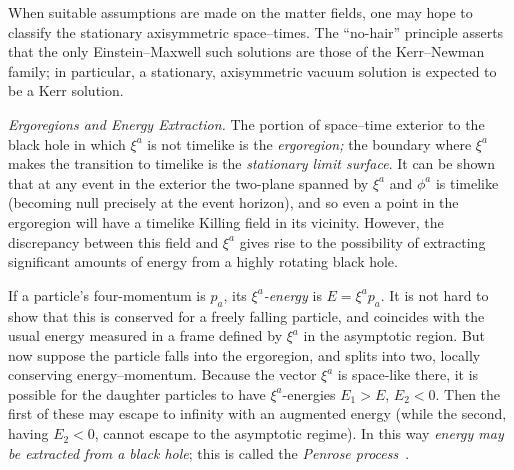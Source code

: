 \documentclass[12pt]{article}
\begin{document}
When suitable assumptions are made on the matter fields, one may hope to classify the stationary axisymmetric space--times.  The ``no-hair'' principle asserts that the only Einstein--Maxwell such solutions are those of the Kerr--Newman family; in particular, a stationary, axisymmetric vacuum solution is expected to be a Kerr solution.


{\em Ergoregions and Energy Extraction.}
The portion of space--time exterior to the black hole in which $\xi ^a$ is not timelike is the {\em ergoregion;} the boundary where $\xi ^a$ makes the transition to timelike is the {\em stationary limit surface}.
It can be shown that at any event in the exterior the two-plane spanned by $\xi ^a$ and $\phi ^a$ is timelike (becoming null precisely at the event horizon), and so even a point in the ergoregion will have a timelike Killing field in its vicinity.
However, the discrepancy between this field and $\xi ^a$
gives rise to the possibility of extracting significant amounts of energy from a highly rotating black hole.



If  a particle's four-momentum is $p_a$, its $\xi ^a${\em -energy} is $E=\xi ^ap_a$.  It is not hard to show that this is conserved for a freely falling particle, and coincides with the usual energy measured in a frame defined by $\xi ^a$ in the asymptotic region.  But now suppose the particle falls into the ergoregion, and splits into two, locally conserving energy--momentum.  Because the vector $\xi ^a$ is space-like there, it is possible for the daughter particles to have $\xi ^a$-energies $E_1>E$, $E_2<0$.  Then the first of these may escape to infinity with an augmented energy (while the second, having $E_2<0$, cannot escape  to the asymptotic regime).  In this way {\em energy may be extracted from a black hole}; this is called the {\em Penrose process}~\citep{Penrose:1965}.  
\end{document}
